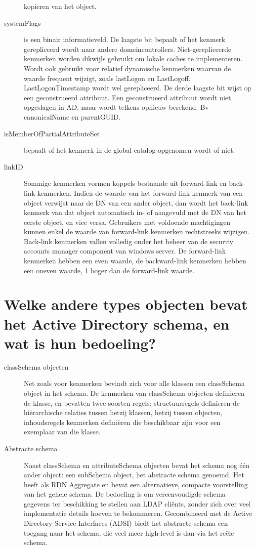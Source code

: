 \begin{description}
		kopieren van het object.
	\item[systemFlags] is een binair informatieveld. De laagste bit bepaalt
		of het kenmerk gerepliceerd wordt naar andere domeincontrollers.
		Niet-gerepliceerde kenmerken worden dikwijls gebruikt om lokale
		caches te implementeren. Wordt ook gebruikt voor relatief
		dynamische kenmerken waarvan de waarde frequent wijzigt, zoals
		lastLogon en LastLogoff. LastLogonTimestamp wordt wel
		gerepliceerd.
		De derde laagste bit wijst op een geconstrueerd attribuut. Een
		geconstrueerd attribuut wordt niet opgeslagen in AD, maar wordt
		telkens opnieuw berekend. Bv canonicalName en parentGUID.
	\item[isMemberOfPartialAttributeSet] bepaalt of het kenmerk in de global
		catalog opgenomen wordt of niet.
	\item[linkID] Sommige kenmerken vormen koppels bestaande uit
		forward-link en back-link kenmerken. Indien de waarde van het
		forward-link kenmerk van een object verwijst naar de DN van een
		ander object, dan wordt het back-link kenmerk van dat object
		automatisch in- of aangevuld met de DN van het eerste object, en
		vice versa. Gebruikers met voldoende machtigingen kunnen enkel
		de waarde van forward-link kenmerken rechtstreeks wijzigen.
		Back-link kenmerken vallen volledig onder het beheer van de
		security accounts manager component van windows server. De
		forward-link kenmerken hebben een even waarde, de backward-link
		kenmerken hebben een oneven waarde, 1 hoger dan de forward-link
		waarde.
\end{description}

\section{Welke andere types objecten bevat het Active Directory schema, en wat
is hun bedoeling?}

\begin{description}
	\item[classSchema objecten] Net zoals voor kenmerken bevindt zich voor
		alle klassen een classSchema object in het schema. De kenmerken
		van classSchema objecten definieren de klasse, en bevatten twee
		soorten regels: structuurregels definieren de hiërarchische
		relaties tussen hetzij klassen, hetzij tussen objecten,
		inhoudsregels kenmerken definiëren die beschikbaar zijn voor een
		exemplaar van die klasse.
	\item[Abstracte schema] Naast classSchema en attributeSchema
		objecten bevat het schema nog één ander object: een subSchema
		object, het abstracte schema genoemd. Het heeft als RDN
		Aggregate en bevat een alternatieve, compacte voorstelling van
		het gehele schema. De bedoeling is om vereenvoudigde schema
		gegevens ter beschikking te stellen aan LDAP cliënts, zonder
		zich over veel implementatie details hoeven te bekommeren.
		Gecombineerd met de Active Directory Service Interfaces (ADSI)
		biedt het abstracte schema een toegang naar het schema, die veel
		meer high-level is dan via het reële schema.
\end{description}

